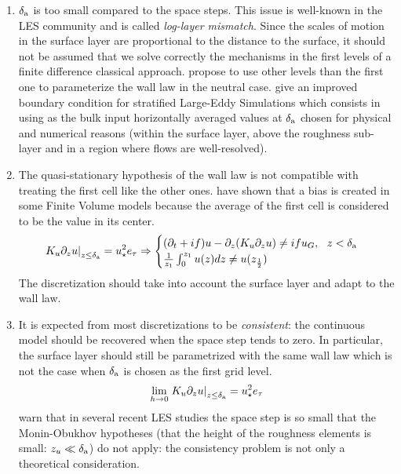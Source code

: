 \begin{enumerate}
	\item $\delta_{\rm a}$ is too small compared to the space steps.
		This issue is well-known
		in the LES community and is called
		\textit{log-layer mismatch}.
		Since the scales of motion
		in the surface layer are proportional to the distance
		to the surface, it should not be assumed that we solve
		correctly the mechanisms in the first levels
		of a finite difference classical approach.
		\citep{kawai_wall-modeling_2012} propose to use other
		levels than the first one to parameterize the
		wall law in the neutral case.
		\citep{maronga_improved_2020} give an improved
		boundary condition for stratified Large-Eddy Simulations
		which consists in using as the bulk input
		horizontally averaged values at
		$\delta_{\rm a}$ chosen for physical and numerical
		reasons (within the surface layer, above the
		roughness sub-layer and in a region where flows are
		well-resolved).
	\item The quasi-stationary hypothesis of the wall law is
		not compatible with treating the first cell like
		the other ones.
		\citep{nishizawa_surface_2018} have shown that a
		bias is created in some Finite Volume models
		because the average of the first cell is considered
		to be the value in its center.
		\begin{equation}
		\left.K_u \partial_z u\right|_{z\leq\delta_{\rm a}}
			= u_\star^2 e_\tau
		\Rightarrow
		\begin{cases}
  (\partial_t + if) u - \partial_z (K_u \partial_z u) \neq if u_G
			, ~~ z < \delta_{\rm a}\\
		\frac{1}{z_1}\int_0^{z_1}u(z) dz \neq u(z_\frac{1}{2})
		\end{cases}
		\end{equation}
		The discretization should take into account the
		surface layer and adapt to the wall law.
	\item It is expected from most discretizations to be
		\textit{consistent}: the continuous
		model should be recovered when the space step tends
		to zero.  In particular, the surface layer should
		still be parametrized with the same wall law which
		is not the case when $\delta_{\rm a}$ is chosen
		as the first grid
		level.
		\begin{equation}
			\lim_{h\rightarrow 0}
		\left.K_u \partial_z u\right|_{z\leq\delta_{\rm a}}=
			u_\star^2 e_\tau
		\end{equation}
		\citep{basu_cautionary_2017} warn that
		in several recent LES studies the space step is
		so small that the Monin-Obukhov hypotheses
		(that the height of the roughness elements is small:
		$z_u \ll \delta_{\rm a}$)
		do not apply: the consistency problem is not only
		a theoretical consideration.
\end{enumerate}
